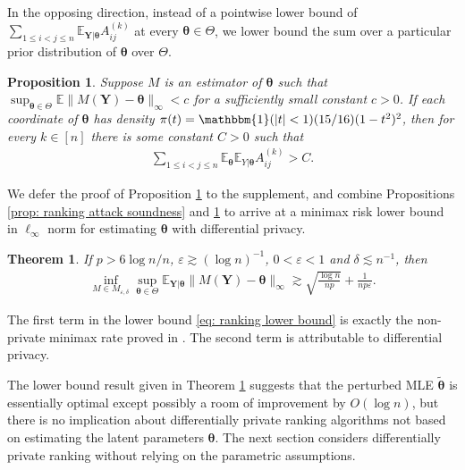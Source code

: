 \documentclass[letterpaper,12pt]{article}
\numberwithin{equation}{section}
\theoremstyle{plain}
\newtheorem{Theorem}{Theorem}
\numberwithin{Theorem}{section}
\numberwithin{corollary}{section}
\newtheorem{proposition}{Proposition}
\numberwithin{proposition}{section}
\numberwithin{Lemma}{section}
{
	\theoremstyle{definition}
	\newtheorem{Definition}{Definition}
	\newtheorem{example}{Example}
	\numberwithin{example}{section}
	\newtheorem{fact}{Fact}
	\numberwithin{fact}{section}
	\newtheorem{remark}{Remark}
}
\newcommand{\1}{\mathbbm{1}}
\def\bth{{\boldsymbol{\theta}}}
\def\E{\mathbb{E}}
\begin{document}
In the opposing direction, instead of a pointwise lower bound of $\sum_{1 \leq i < j \leq n} \E_{\bm Y|\bth} A^{(k)}_{ij}$ at every $\bth \in \Theta$, we lower bound the sum over a particular prior distribution of $\bth$ over $\Theta$.

\begin{proposition}\label{prop: ranking attack completeness}
	Suppose $M$ is an estimator of $\bth$ such that $\sup_{\bth \in \Theta} \E\|M(\bm Y) - \bth\|_\infty < c$ for a sufficiently small constant $c > 0$. If each coordinate of $\bth$ has density $\pi(t) = \1(|t| < 1)(15/16)(1-t^2)^2$, then for every $k \in [n]$ there is some constant $C > 0$ such that\begin{align}\label{eq: ranking attack completeness}
		\sum_{1 \leq i < j \leq n} \E_\bth \E_{Y|\bth} A^{(k)}_{ij} > C.
	\end{align}
\end{proposition}

We defer the proof of Proposition \ref{prop: ranking attack completeness} to the supplement, and combine Propositions \ref{prop: ranking attack soundness} and \ref{prop: ranking attack completeness} to arrive at a minimax risk lower bound in $\ell_\infty$ norm for estimating $\bth$ with differential privacy.
\begin{Theorem}\label{thm: ranking lower bound}
	If $p > 6\log n/n$, $\varepsilon \gtrsim (\log n)^{-1}$, $0 < \varepsilon < 1$ and $\delta \lesssim n^{-1}$, then 
	\begin{align} \label{eq: ranking lower bound}
		\inf_{M \in M_{\varepsilon, \delta}}\sup_{\bth \in \Theta} \E_{\bm Y|\bth} \|M(\bm Y) - \bth\|_\infty \gtrsim \sqrt{\frac{\log n}{np}} + \frac{1}{np\varepsilon}.
	\end{align}
\end{Theorem}
The first term in the lower bound \eqref{eq: ranking lower bound} is exactly the non-private minimax rate proved in \cite{shah2017simple, chen2019spectral}. The second term is attributable to differential privacy.

The lower bound result given in Theorem \ref{thm: ranking lower bound} suggests that the perturbed MLE $\widetilde\bth$ is essentially optimal except possibly a room of improvement by $O(\log n)$, but there is no implication about differentially private ranking algorithms not based on estimating the latent parameters $\bth$. The next section considers differentially private ranking without relying on the parametric assumptions.

\vspace{-5mm}
\end{document}

